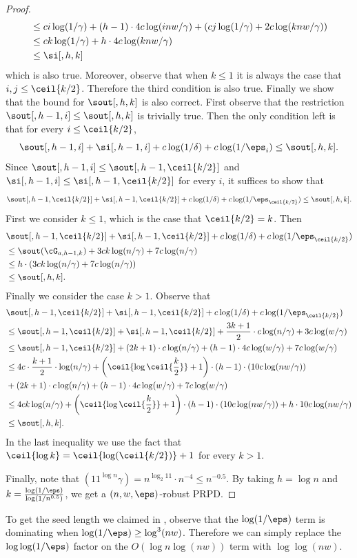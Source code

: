 \begin{proof}
\begin{align*}
&\le ci\log(1/\gamma)+(h-1)\cdot 4c\log(inw/\gamma)+(cj\log(1/\gamma)+2c\log(knw/\gamma))\\
&\le ck\log(1/\gamma) +h\cdot 4c\log(knw/\gamma)\\
&\le \si[,h,k]
\end{align*}
which is also true. Moreover, observe that when $k\le 1$ it is always the case that $i,j\le\ceil{k/2}$. Therefore the third condition is also true. Finally we show that the bound for $\sout[,h,k]$ is also correct. First observe that the restriction $\sout[,h-1,i]\le \sout[,h,k]$ is trivially true. Then the only condition left is that for every $i\le\ceil{k/2}$,
$$\sout[,h-1,i]+\si[,h-1,i]+c\log(1/\delta)+c\log(1/\eps_i)\le \sout[,h,k].$$ Since $\sout[,h-1,i]\le \sout[,h-1,\ceil{k/2}]$ and $\si[,h-1,i]\le \si[,h-1,\ceil{k/2}]$ for every $i$, it suffices to show that 
$$\sout[,h-1,\ceil{k/2}]+\si[,h-1,\ceil{k/2}]+c\log(1/\delta)+c\log(1/\eps_{\ceil{k/2}})\le \sout[,h,k].$$
First we consider $k\le 1$, which is the case that $\ceil{k/2}=k$. Then 
\begin{align*}
&\sout[,h-1,\ceil{k/2}]+\si[,h-1,\ceil{k/2}]+c\log(1/\delta)+c\log(1/\eps_{\ceil{k/2}})\\
&\le \sout(\cG_{a,h-1,k}) + 3ck\log(n/\gamma) + 7c\log(n/\gamma)\\
&\le h \cdot (3ck\log(n/\gamma) + 7c\log(n/\gamma)) \\
&\le  \sout[,h,k].
\end{align*}
Finally we consider the case $k>1$. Observe that 
\begin{align*}
&\sout[,h-1,\ceil{k/2}]+\si[,h-1,\ceil{k/2}]+c\log(1/\delta)+c\log(1/\eps_{\ceil{k/2}})\\
&\le \sout[,h-1,\ceil{k/2}]+\si[,h-1,\ceil{k/2}] + \frac{3k+1}{2}\cdot c\log(n/\gamma)+3c\log(w/\gamma)\\
&\le \sout[,h-1,\ceil{k/2}]+ (2k+1)\cdot c\log(n/\gamma) + (h-1)\cdot 4c\log(w/\gamma) + 7c\log(w/\gamma) \\
&\le  4c\cdot\frac{k+1}{2}\cdot\log(n/\gamma) + \left(\ceil{\log \ceil{\frac{k}{2}}}+1\right)\cdot (h-1) \cdot (10c\log(nw/\gamma)) \\
&+ (2k+1)\cdot c\log(n/\gamma) + (h-1)\cdot 4c\log(w/\gamma) + 7c\log(w/\gamma) \\
&\le 4ck\log(n/\gamma) + \left(\ceil{\log \ceil{\frac{k}{2}}}+1\right)\cdot (h-1) \cdot (10c\log(nw/\gamma)) + h\cdot 10c\log(nw/\gamma)  \\
&\le \sout[,h,k].
\end{align*}
In the last inequality we use the fact that $\ceil{\log k}=\ceil{\log(\ceil{k/2})}+1$ for every $k>1$.

Finally, note that $(11^{\log n}\gamma)=n^{\log_2 11}\cdot n^{-4}\le n^{-0.5}$. By taking $h=\log n$ and  $k=\frac{\log(1/\eps)}{\log (1/n^{0.5})}$, we get a $(n,w,\eps)$-robust PRPD.
\end{proof}

\begin{remark}
To get the seed length we claimed in , observe that the $\log(1/\eps)$ term is dominating when $\log(1/\eps)\ge \log^3(nw)$. Therefore we can simply replace the $\log\log(1/\eps)$ factor on the $O(\log n\log (nw))$ term with $\log\log(nw)$.
\end{remark}
